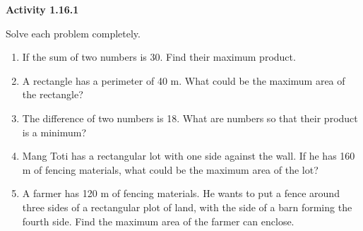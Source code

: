 \noindent\textbf{Activity 1.16.1}


Solve each problem completely.
\begin{enumerate}[label = \color{blue}\arabic*. ]
\item If the sum of two numbers is 30. Find their maximum product. 
\item A rectangle has a perimeter of 40 m. What could be the maximum area of the rectangle?
\item The difference of two numbers is 18. What are numbers so that their product is a minimum?
\item Mang Toti has a rectangular lot with one side against the wall. If he has 160 m of fencing materials, what could be the maximum area of the lot?
\item A farmer has 120 m of fencing materials. He wants to put a fence around three sides of a rectangular plot of land, with the side of a barn forming the fourth side. Find the maximum area of the farmer can enclose. 
\end{enumerate}
